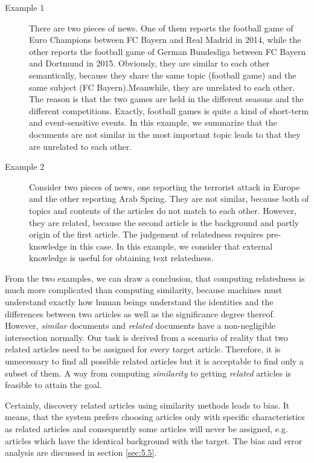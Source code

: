\begin{description}
\item[Example 1] There are two pieces of news. One of them reports the football game of Euro Champions between FC Bayern and Real Madrid in 2014, while the other reports the football game of German Bundesliga between FC Bayern and Dortmund in 2015. Obviously, they are similar to each other semantically, because they share the same topic (football game) and the same subject (FC Bayern).Meanwhile, they are unrelated to each other. The reason is that the two games are held in the different seasons and the different competitions. Exactly, football games is quite a kind of short-term and event-sensitive events. In this example, we summarize that the documents are not similar in the most important topic leads to that they are unrelated to each other.
\item[Example 2] Consider two pieces of news, one reporting the terrorist attack in Europe and the other reporting Arab Spring. They are not similar, because both of topics and contents of the articles do not match to each other. However, they are related, because the second article is the background and partly origin of the first article. The judgement of relatedness requires pre-knowledge in this case. In this example, we consider that external knowledge is useful for obtaining text relatedness. 
\end{description}

From the two examples, we can draw a conclusion, that computing relatedness is much more complicated than computing similarity, because machines must understand exactly how human beings understand the identities and the differences between two articles as well as the significance degree thereof. However, \textit{similar} documents and \textit{related} documents have a non-negligible intersection normally. Our task is derived from a scenario of reality that two related articles need to be assigned for every target article. Therefore, it is unnecessary to find all possible related articles but it is acceptable to find only a subset of them. A way from computing \textit{similarity} to getting \textit{related} articles is feasible to attain the goal.

Certainly, discovery related articles using similarity methods leads to bias. It means, that the system prefers choosing articles only with specific characteristics as related articles and consequently some articles will never be assigned, e.g. articles which have the identical background with the target. The bias and error analysis are discussed in section \ref{sec:5.5}.

